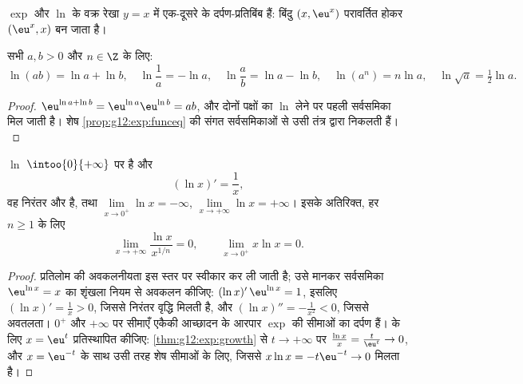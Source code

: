 \begin{omfigure}

{\small $\exp$ और $\ln$ के वक्र रेखा $y = x$ में एक-दूसरे के दर्पण-प्रतिबिंब हैं:
बिंदु $(x, \eu^x)$ परावर्तित होकर $(\eu^x, x)$ बन जाता है।}
\end{omfigure}

\begin{proposition}[बीजगणितीय गुण]\label{prop:g12:exp:lnalg}
सभी $a, b > 0$ और $n \in \Z$ के लिए:
\[
\ln(ab) = \ln a + \ln b, \quad
\ln\frac{1}{a} = -\ln a, \quad
\ln\frac{a}{b} = \ln a - \ln b, \quad
\ln(a^n) = n \ln a, \quad
\ln\sqrt{a} = \tfrac12 \ln a .
\]
\end{proposition}

\begin{proof}
$\eu^{\ln a + \ln b} = \eu^{\ln a}\eu^{\ln b} = ab$, और दोनों पक्षों का $\ln$ लेने पर पहली सर्वसमिका मिल जाती है। शेष \cref{prop:g12:exp:funceq}
की संगत सर्वसमिकाओं से उसी तंत्र द्वारा निकलती हैं।
\end{proof}

\begin{proposition}[विश्लेषणात्मक गुण]\label{prop:g12:exp:lnanalytic}
 $\ln$ $\intoo{0}{+\infty}$ पर  है और
\[
(\ln x)' = \frac{1}{x},
\]
वह निरंतर  और  है, तथा $\lim\limits_{x\to0^+} \ln x = -\infty$, $\lim\limits_{x\to+\infty} \ln x = +\infty$। इसके अतिरिक्त, हर 
$n \geq 1$ के लिए
\[
\lim_{x\to+\infty} \frac{\ln x}{x^{1/n}} = 0, \qquad
\lim_{x\to0^+} x \ln x = 0 .
\]
\end{proposition}

\begin{proof}
प्रतिलोम  की अवकलनीयता इस स्तर पर स्वीकार कर ली जाती है; उसे मानकर
सर्वसमिका $\eu^{\ln x} = x$ का शृंखला नियम से अवकलन कीजिए: $(\ln x)'\,\eu^{\ln x} = 1$, इसलिए $(\ln x)' = \frac{1}{x} > 0$, जिससे
निरंतर वृद्धि मिलती है, और $(\ln x)'' = -\frac1{x^2} < 0$, जिससे अवतलता। $0^+$ और $+\infty$ पर सीमाएँ
एकैकी आच्छादन के आरपार $\exp$ की सीमाओं का दर्पण हैं।  के लिए
$x = \eu^{t}$ प्रतिस्थापित कीजिए: \cref{thm:g12:exp:growth} से $t \to +\infty$ पर $\frac{\ln x}{x} = \frac{t}{\eu^t} \to 0$, और $x = \eu^{-t}$ के साथ उसी तरह
शेष सीमाओं के लिए, जिससे $x\ln x = -t\eu^{-t} \to 0$ मिलता है।
\end{proof}

